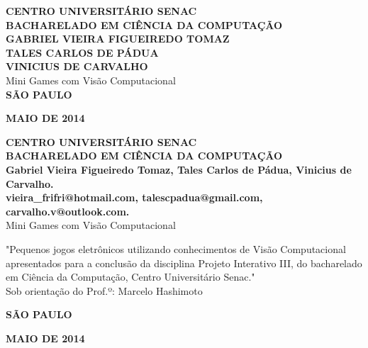 \documentclass[a4paper]{article}
\begin{document}
\begin{titlepage}
 \vfill
  \begin{center}
   {\large \textbf{CENTRO UNIVERSITÁRIO SENAC}} \\
   {\large \textbf{BACHARELADO EM CIÊNCIA DA COMPUTAÇÃO}} \\[4cm]
   
   {\large \textbf{GABRIEL VIEIRA FIGUEIREDO TOMAZ}}\\
   {\large \textbf{TALES CARLOS DE PÁDUA}}\\
   {\large \textbf{VINICIUS DE CARVALHO}}\\[4cm]


   {\Large Mini Games com Visão Computacional}\\[4cm]

\vspace{2cm}
\large \textbf{SÃO PAULO}

\large \textbf{MAIO DE 2014}
\end{center}
\end{titlepage}

\break

\begin{titlepage}
 \vfill
  \begin{center}
   {\large \textbf{CENTRO UNIVERSITÁRIO SENAC}} \\
   {\large \textbf{BACHARELADO EM CIÊNCIA DA COMPUTAÇÃO}} \\[4cm]

   {\large \textbf{Gabriel Vieira Figueiredo Tomaz, Tales Carlos de Pádua, Vinicius de Carvalho.}}\\ [1cm]
  
   {\large \textbf{vieira\_frifri@hotmail.com, talescpadua@gmail.com, carvalho.v@outlook.com.}}\\ [3cm]
   
 
   {\Large Mini Games com Visão Computacional}\\[2cm]

   \hspace{.45\textwidth} 
   \begin{minipage}{.5\textwidth}
   \large "Pequenos jogos eletrônicos utilizando conhecimentos de Visão Computacional apresentados para a conclusão da disciplina Projeto Interativo III, do bacharelado em Ciência da Computação, Centro Universitário Senac."\\[0.5cm]
			Sob orientação do Prof.º: Marcelo Hashimoto
  \end{minipage}
  \vfill

\vspace{1cm}
\large \textbf{SÃO PAULO}

\large \textbf{MAIO DE 2014}
\end{center}
\end{titlepage}
\end{document}
